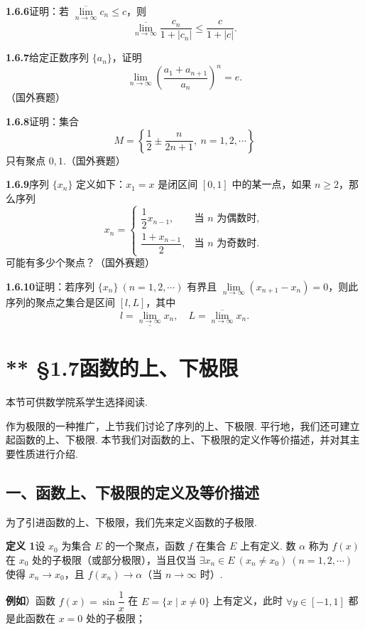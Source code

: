 \documentclass[UTF8, 12pt, fontset=fandol, oneside]{ctexart}
\begin{document}
\noindent\textbf{1.6.6}\quad 证明：若 $\overline{\lim\limits_{n\to\infty}}c_n\le c$，则
\[
  \overline{\lim_{n\to\infty}}\frac{c_n}{1+|c_n|}
  \le \frac{c}{1+|c|}.
\]

\noindent\textbf{1.6.7}\quad 给定正数序列 $\{a_n\}$，证明
\[
  \lim_{n\to\infty}\left(\frac{a_1+a_{n+1}}{a_n}\right)^n=e.
\]
（国外赛题）

\noindent\textbf{1.6.8}\quad 证明：集合
\[
  M=\left\{\frac12\pm\frac{n}{2n+1},\ n=1,2,\cdots\right\}
\]
只有聚点 $0,1$.（国外赛题）

\noindent\textbf{1.6.9}\quad 序列 $\{x_n\}$ 定义如下：$x_1=x$ 是闭区间 $[0,1]$ 中的某一点，如果 $n\ge2$，那么序列
\[
  x_n=
  \begin{cases}
    \dfrac12x_{n-1}, & \text{当 }n\text{ 为偶数时},\\[1mm]
    \dfrac{1+x_{n-1}}2, & \text{当 }n\text{ 为奇数时}.
  \end{cases}
\]
可能有多少个聚点？（国外赛题）

\noindent\textbf{1.6.10}\quad 证明：若序列 $\{x_n\}\ (n=1,2,\cdots)$ 有界且 $\lim\limits_{n\to\infty}(x_{n+1}-x_n)=0$，则此序列的聚点之集合是区间 $[l,L]$，其中
\[
  l=\underline{\lim_{n\to\infty}}x_n,\quad L=\overline{\lim_{n\to\infty}}x_n.
\]

\section*{** §1.7\quad 函数的上、下极限}

本节可供数学院系学生选择阅读.

作为极限的一种推广，上节我们讨论了序列的上、下极限. 平行地，我们还可建立起函数的上、下极限. 本节我们对函数的上、下极限的定义作等价描述，并对其主要性质进行介绍.

\subsection*{一、函数上、下极限的定义及等价描述}

为了引进函数的上、下极限，我们先来定义函数的子极限.

\noindent\textbf{定义 1}\quad 设 $x_0$ 为集合 $E$ 的一个聚点，函数 $f$ 在集合 $E$ 上有定义. 数 $\alpha$ 称为 $f(x)$ 在 $x_0$ 处的子极限（或部分极限），当且仅当 $\exists x_n\in E\ (x_n\ne x_0)\ (n=1,2,\cdots)$ 使得 $x_n\to x_0$，且 $f(x_n)\to\alpha$（当 $n\to\infty$ 时）.

\noindent\textbf{例如}）函数 $f(x)=\sin\dfrac1x$ 在 $E=\{x\mid x\ne0\}$ 上有定义，此时 $\forall y\in[-1,1]$ 都是此函数在 $x=0$ 处的子极限；
\end{document}

